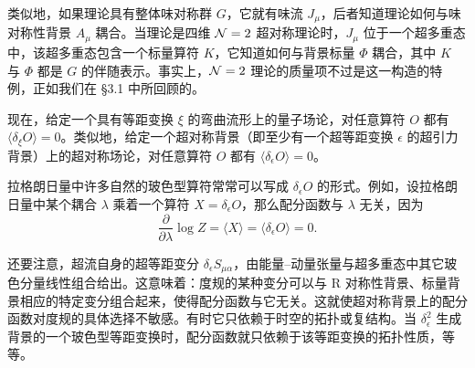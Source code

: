 类似地，如果理论具有整体味对称群 $G$，它就有味流 $J_\mu$，后者知道理论如何与味对称性背景 $A_\mu$ 耦合。当理论是四维 $\mathcal{N}=2$ 超对称理论时，$J_\mu$ 位于一个超多重态中，该超多重态包含一个标量算符 $K$，它知道如何与背景标量 $\Phi$ 耦合，其中 $K$ 与 $\Phi$ 都是 $G$ 的伴随表示。事实上，$\mathcal{N}=2$ 理论的质量项不过是这一构造的特例，正如我们在 §3.1 中所回顾的。


现在，给定一个具有等距变换 $\xi$ 的弯曲流形上的量子场论，对任意算符 $O$ 都有 $\langle\delta_\xi O\rangle=0$。类似地，给定一个超对称背景（即至少有一个超等距变换 $\epsilon$ 的超引力背景）上的超对称场论，对任意算符 $O$ 都有 $\langle\delta_\epsilon O\rangle=0$。

拉格朗日量中许多自然的玻色型算符常常可以写成 $\delta_\epsilon O$ 的形式。例如，设拉格朗日量中某个耦合 $\lambda$ 乘着一个算符 $X=\delta_\epsilon O$，那么配分函数与 $\lambda$ 无关，因为
\begin{equation}
\frac{\partial}{\partial\lambda}\log Z=\langle X\rangle=\langle\delta_\epsilon O\rangle=0.
\tag{4.1}
\end{equation}


还要注意，超流自身的超等距变分 $\delta_\epsilon S_{\mu\alpha}$，由能量–动量张量与超多重态中其它玻色分量线性组合给出。这意味着：度规的某种变分可以与 R 对称性背景、标量背景相应的特定变分组合起来，使得配分函数与它无关。这就使超对称背景上的配分函数对度规的具体选择不敏感。有时它只依赖于时空的拓扑或复结构。当 $\delta_\epsilon^2$ 生成背景的一个玻色型等距变换时，配分函数就只依赖于该等距变换的拓扑性质，等等。

